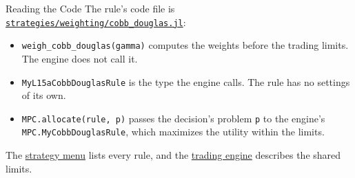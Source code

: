 \documentclass[aspectratio=169,11pt]{beamer}
\newcommand{\repo}{https://github.com/varnerlab/CHEME-5660-CourseRepository-Fall-2026/blob/main/lectures/week-15/L15a}
\begin{document}
\begin{frame}{Reading the Code}
  \vspace{0.3em}
  The rule's code file is
  \href{\repo/strategies/weighting/cobb_douglas.jl}{\texttt{strategies/weighting/cobb\_douglas.jl}}:
  \begin{itemize}\setlength{\itemsep}{0.5em}
    \item \texttt{weigh\_cobb\_douglas(gamma)} computes the weights before the trading limits. The engine does not call it.
    \item \texttt{MyL15aCobbDouglasRule} is the type the engine calls. The rule has no settings of its own.
    \item \texttt{MPC.allocate(rule, p)} passes the decision's problem \texttt{p} to the engine's \texttt{MPC.MyCobbDouglasRule}, which maximizes the utility within the limits.
  \end{itemize}

  \vspace{0.5em}
  The \href{\repo/strategies/CHEME-5660-L15a-Strategy-Menu-Fall-2026.ipynb}{strategy menu} lists every rule, and the \href{\repo/engine/CHEME-5660-L15a-Trading-Engine-Fall-2026.ipynb}{trading engine} describes the shared limits.
\end{frame}
\end{document}
